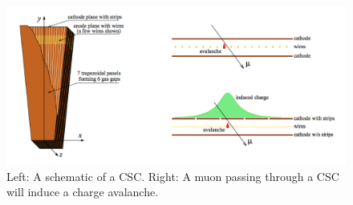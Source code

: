 \begin{figure}[H]
    \centering
    \includegraphics[width=\textwidth]{Images/CMS/CSCDiagram.png}
    \caption{Left: A schematic of a CSC. Right: A muon passing through a CSC will induce a charge avalanche.}
    \label{fig:CSCDiagram}
\end{figure}
